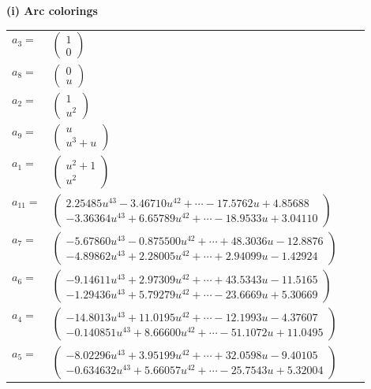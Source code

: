 \documentclass[1p]{elsarticle_modified}
\theoremstyle{definition}
\begin{document}
\flushleft \textbf{(i) Arc colorings}\\
\begin{tabular}{m{7pt} m{180pt} m{7pt} m{180pt} }
\flushright $a_{3}=$&$\begin{pmatrix}1\\0\end{pmatrix}$ \\
\flushright $a_{8}=$&$\begin{pmatrix}0\\u\end{pmatrix}$ \\
\flushright $a_{2}=$&$\begin{pmatrix}1\\u^2\end{pmatrix}$ \\
\flushright $a_{9}=$&$\begin{pmatrix}u\\u^3+u\end{pmatrix}$ \\
\flushright $a_{1}=$&$\begin{pmatrix}u^2+1\\u^2\end{pmatrix}$ \\
\flushright $a_{11}=$&$\begin{pmatrix}2.25485 u^{43}-3.46710 u^{42}+\cdots-17.5762 u+4.85688\\-3.36364 u^{43}+6.65789 u^{42}+\cdots-18.9533 u+3.04110\end{pmatrix}$ \\
\flushright $a_{7}=$&$\begin{pmatrix}-5.67860 u^{43}-0.875500 u^{42}+\cdots+48.3036 u-12.8876\\-4.89862 u^{43}+2.28005 u^{42}+\cdots+2.94099 u-1.42924\end{pmatrix}$ \\
\flushright $a_{6}=$&$\begin{pmatrix}-9.14611 u^{43}+2.97309 u^{42}+\cdots+43.5343 u-11.5165\\-1.29436 u^{43}+5.79279 u^{42}+\cdots-23.6669 u+5.30669\end{pmatrix}$ \\
\flushright $a_{4}=$&$\begin{pmatrix}-14.8013 u^{43}+11.0195 u^{42}+\cdots-12.1993 u-4.37607\\-0.140851 u^{43}+8.66600 u^{42}+\cdots-51.1072 u+11.0495\end{pmatrix}$ \\
\flushright $a_{5}=$&$\begin{pmatrix}-8.02296 u^{43}+3.95199 u^{42}+\cdots+32.0598 u-9.40105\\-0.634632 u^{43}+5.66057 u^{42}+\cdots-25.7543 u+5.32004\end{pmatrix}$ \\

\end{tabular}
\end{document}
